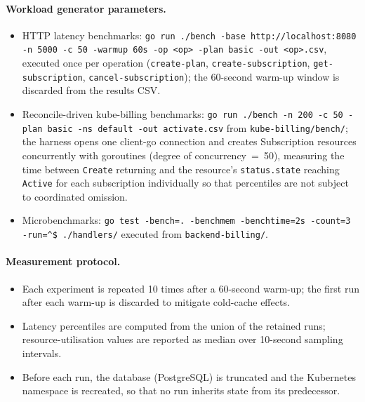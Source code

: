 \paragraph{Workload generator parameters.}
\begin{itemize}
    \item HTTP latency benchmarks: \texttt{go run ./bench -base http://localhost:8080 -n 5000 -c 50 -warmup 60s -op <op> -plan basic -out <op>.csv}, executed once per operation (\texttt{create-plan}, \texttt{create-subscription}, \texttt{get-subscription}, \texttt{cancel-subscription}); the 60-second warm-up window is discarded from the results CSV.
    \item Reconcile-driven kube-billing benchmarks: \texttt{go run ./bench -n 200 -c 50 -plan basic -ns default -out activate.csv} from \texttt{kube-billing/bench/}; the harness opens one client-go connection and creates Subscription resources concurrently with goroutines (degree of concurrency~=~50), measuring the time between \texttt{Create} returning and the resource's \texttt{status.state} reaching \texttt{Active} for each subscription individually so that percentiles are not subject to coordinated omission.
    \item Microbenchmarks: \texttt{go test -bench=. -benchmem -benchtime=2s -count=3 -run=\^{}\$ ./handlers/} executed from \texttt{backend-billing/}.
\end{itemize}

\paragraph{Measurement protocol.}
\begin{itemize}
    \item Each experiment is repeated 10 times after a 60-second warm-up; the first run after each warm-up is discarded to mitigate cold-cache effects.
    \item Latency percentiles are computed from the union of the retained runs; resource-utilisation values are reported as median over 10-second sampling intervals.
    \item Before each run, the database (PostgreSQL) is truncated and the Kubernetes namespace is recreated, so that no run inherits state from its predecessor.
\end{itemize}

